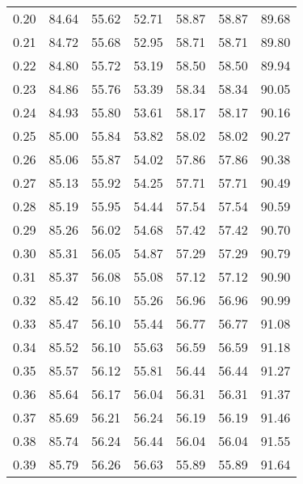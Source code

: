 \begin{tabular}{|c|c|c|c|c|c|c|}
      0.20 &     84.64 &     55.62 &      52.71 &   58.87 &      58.87 &         89.68 \\
      0.21 &     84.72 &     55.68 &      52.95 &   58.71 &      58.71 &         89.80 \\
      0.22 &     84.80 &     55.72 &      53.19 &   58.50 &      58.50 &         89.94 \\
      0.23 &     84.86 &     55.76 &      53.39 &   58.34 &      58.34 &         90.05 \\
      0.24 &     84.93 &     55.80 &      53.61 &   58.17 &      58.17 &         90.16 \\
      0.25 &     85.00 &     55.84 &      53.82 &   58.02 &      58.02 &         90.27 \\
      0.26 &     85.06 &     55.87 &      54.02 &   57.86 &      57.86 &         90.38 \\
      0.27 &     85.13 &     55.92 &      54.25 &   57.71 &      57.71 &         90.49 \\
      0.28 &     85.19 &     55.95 &      54.44 &   57.54 &      57.54 &         90.59 \\
      0.29 &     85.26 &     56.02 &      54.68 &   57.42 &      57.42 &         90.70 \\
      0.30 &     85.31 &     56.05 &      54.87 &   57.29 &      57.29 &         90.79 \\
      0.31 &     85.37 &     56.08 &      55.08 &   57.12 &      57.12 &         90.90 \\
      0.32 &     85.42 &     56.10 &      55.26 &   56.96 &      56.96 &         90.99 \\
      0.33 &     85.47 &     56.10 &      55.44 &   56.77 &      56.77 &         91.08 \\
      0.34 &     85.52 &     56.10 &      55.63 &   56.59 &      56.59 &         91.18 \\
      0.35 &     85.57 &     56.12 &      55.81 &   56.44 &      56.44 &         91.27 \\
      0.36 &     85.64 &     56.17 &      56.04 &   56.31 &      56.31 &         91.37 \\
      0.37 &     85.69 &     56.21 &      56.24 &   56.19 &      56.19 &         91.46 \\
      0.38 &     85.74 &     56.24 &      56.44 &   56.04 &      56.04 &         91.55 \\
      0.39 &     85.79 &     56.26 &      56.63 &   55.89 &      55.89 &         91.64 \\

\end{tabular}
